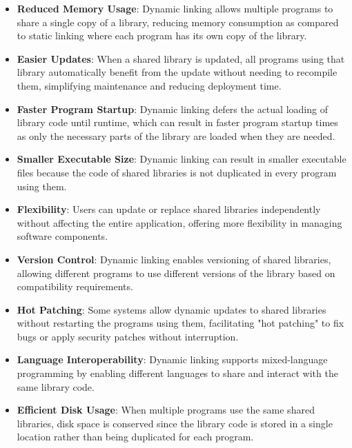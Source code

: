 \documentclass[12pt]{book}
\begin{document}
\begin{itemize}
\begin{itemize}
            \begin{itemize}
                \item \textbf{Reduced Memory Usage}: Dynamic linking allows multiple programs to share a single copy of a library, reducing memory consumption as compared to static linking where each program has its own copy of the library.

                \item \textbf{Easier Updates}: When a shared library is updated, all programs using that library automatically benefit from the update without needing to recompile them, simplifying maintenance and reducing deployment time.
                
                \item \textbf{Faster Program Startup}: Dynamic linking defers the actual loading of library code until runtime, which can result in faster program startup times as only the necessary parts of the library are loaded when they are needed.
                
                \item \textbf{Smaller Executable Size}: Dynamic linking can result in smaller executable files because the code of shared libraries is not duplicated in every program using them.
                
                \item \textbf{Flexibility}: Users can update or replace shared libraries independently without affecting the entire application, offering more flexibility in managing software components.
                
                \item \textbf{Version Control}: Dynamic linking enables versioning of shared libraries, allowing different programs to use different versions of the library based on compatibility requirements.
                
                \item \textbf{Hot Patching}: Some systems allow dynamic updates to shared libraries without restarting the programs using them, facilitating "hot patching" to fix bugs or apply security patches without interruption.
                
                \item \textbf{Language Interoperability}: Dynamic linking supports mixed-language programming by enabling different languages to share and interact with the same library code.
                
                \item \textbf{Efficient Disk Usage}: When multiple programs use the same shared libraries, disk space is conserved since the library code is stored in a single location rather than being duplicated for each program.
                

\end{itemize}
\end{itemize}
\end{itemize}
\end{document}
